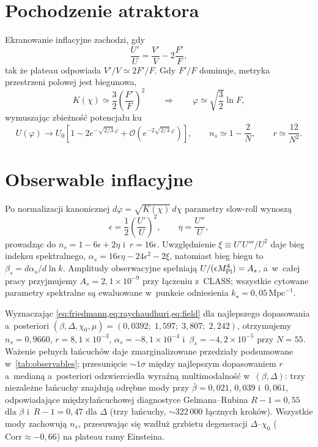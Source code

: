 \documentclass[11pt,a4paper]{article}
\begin{document}
\section{Pochodzenie atraktora}
\label{sec:origin}
Ekranowanie inflacyjne zachodzi, gdy
\begin{equation}
\frac{U'}{U}=\frac{V'}{V}-2\frac{F'}{F},
\end{equation}
tak że plateau odpowiada $V'/V\simeq2F'/F$. Gdy $F'/F$ dominuje, metryka przestrzeni polowej jest biegunowa,
\begin{equation}
K(\chi)\simeq\frac{3}{2}\left(\frac{F'}{F}\right)^{2}\qquad\Rightarrow\qquad \varphi\simeq\sqrt{\frac{3}{2}}\ln F,
\end{equation}
wymuszając zbieżność potencjału ku
\begin{equation}
U(\varphi)\rightarrow U_{0}\left[1-2e^{-\sqrt{2/3}\,\varphi}+\mathcal{O}(e^{-2\sqrt{2/3}\,\varphi})\right], \qquad n_{s}\simeq1-\frac{2}{N}, \qquad r\simeq\frac{12}{N^{2}}.
\end{equation}

\section{Obserwable inflacyjne}
\label{sec:observables}
Po normalizacji kanonicznej $d\varphi=\sqrt{K(\chi)}\,d\chi$ parametry slow-roll wynoszą
\begin{equation}
\epsilon=\frac{1}{2}\left(\frac{U'}{U}\right)^{2}, \qquad \eta=\frac{U''}{U},
\end{equation}
prowadząc do $n_{s}=1-6\epsilon+2\eta$ i~$r=16\epsilon$. Uwzględnienie $\xi \equiv U'U'''/U^{2}$ daje bieg indeksu spektralnego, $\alpha_{s}=16\epsilon\eta-24\epsilon^{2}-2\xi$, natomiast bieg biegu to $\beta_{s}=d\alpha_{s}/d\ln k$. Amplitudy obserwacyjne spełniają $U/(\epsilon M_{\rm Pl}^{4})=A_{s}$, a~w~całej pracy przyjmujemy $A_{s}=2{,}1\times10^{-9}$ przy łączeniu z~\textsc{CLASS}; wszystkie cytowane parametry spektralne są ewaluowane w~punkcie odniesienia $k_{\star}=0{,}05\,\mathrm{Mpc}^{-1}$.

Wyznaczając \cref{eq:friedmann,eq:raychaudhuri,eq:field} dla najlepszego dopasowania a~posteriori $(\beta,\Delta,\chi_{0},\mu)=(0{,}0392;\;1{,}597;\;3{,}807;\;2{,}242)$, otrzymujemy $n_s=0{,}9660$, $r=8{,}1\times10^{-3}$, $\alpha_s=-8{,}1\times10^{-4}$ i~$\beta_s=-4{,}2\times10^{-5}$ przy $N=55$. Ważenie pełnych łańcuchów daje zmarginalizowane przedziały podsumowane w~\cref{tab:observables}; przesunięcie ${\sim}1\sigma$ między najlepszym dopasowaniem $r$ a~medianą a~posteriori odzwierciedla wyraźną multimodalność w~$(\beta,\Delta)$: trzy niezależne łańcuchy znajdują odrębne mody przy $\bar\beta=0{,}021$, $0{,}039$ i~$0{,}061$, odpowiadające międzyłańcuchowej diagnostyce Gelmana--Rubina $R{-}1=0{,}55$ dla $\beta$ i~$R{-}1=0{,}47$ dla $\Delta$ (trzy łańcuchy, ${\sim}322\,000$ łącznych kroków). Wszystkie mody zachowują $n_s$, przesuwając się wzdłuż grzbietu degeneracji $\Delta$--$\chi_0$ ($\mathrm{Corr}\approx-0{,}66$) na plateau ramy Einsteina.
\end{document}
